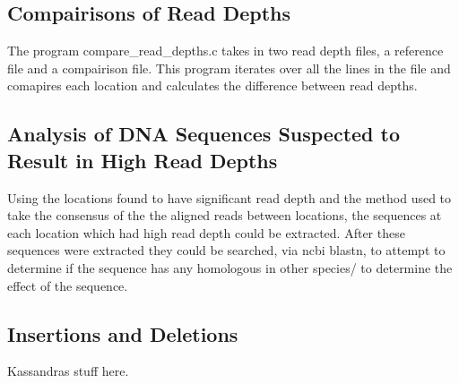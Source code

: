 \documentclass[12pt]{article}
\begin{document}
\subsection{Compairisons of Read Depths}
	The program compare\_read\_depths.c takes in two read depth files, a reference file and a compairison file. This program iterates over all the lines in the file and comapires each location and calculates the difference between read depths.

\subsection{Analysis of DNA Sequences Suspected to Result in High Read Depths}
	Using the locations found to have significant read depth and the method used to take the consensus of the the aligned reads between locations, the sequences at each location which had high read depth could be extracted. After these sequences were extracted they could be searched, via ncbi blastn, to attempt to determine if the sequence has any homologous in other species/ to determine the effect of the sequence.


\subsection{Insertions and Deletions}

	Kassandras stuff here.


%
%
\end{document}
